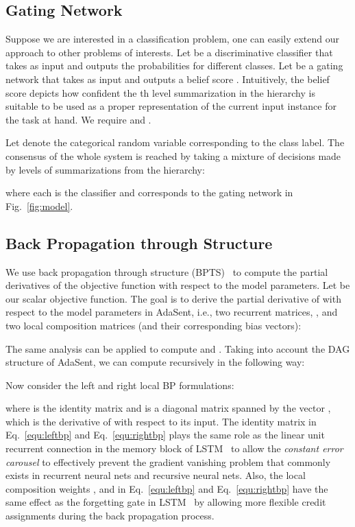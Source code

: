\documentclass{article}
\theoremstyle{definition}
\begin{document}
\subsection{Gating Network}
Suppose we are interested in a classification problem, one can easily extend our approach to other problems of interests. Let  be a discriminative classifier that takes  as input and outputs the probabilities for different classes. Let  be a gating network that takes  as input and outputs a belief score . Intuitively, the belief score  depicts how confident the th level summarization in the hierarchy is suitable to be used as a proper representation of the current input instance for the task at hand. We require  and .

Let  denote the categorical random variable corresponding to the class label. The consensus of the whole system is reached by taking a mixture of decisions made by levels of summarizations from the hierarchy:

where each  is the classifier and  corresponds to the gating network in Fig.~\ref{fig:model}.

\subsection{Back Propagation through Structure}
We use back propagation through structure (BPTS)~\cite{goller1996learning} to compute the partial derivatives of the objective function with respect to the model parameters. Let  be our scalar objective function. The goal is to derive the partial derivative of  with respect to the model parameters in AdaSent, i.e., two recurrent matrices, ,  and two local composition matrices  (and their corresponding bias vectors):

The same analysis can be applied to compute  and . Taking into account the DAG structure of AdaSent, we can compute  recursively in the following way:

Now consider the left and right local BP formulations:

where  is the identity matrix and  is a diagonal matrix spanned by the vector , which is the derivative of  with respect to its input. The identity matrix in Eq.~\ref{equ:leftbp} and Eq.~\ref{equ:rightbp} plays the same role as the linear unit recurrent connection in the memory block of LSTM~\cite{hochreiter1997long} to allow the \emph{constant error carousel} to effectively prevent the gradient vanishing problem that commonly exists in recurrent neural nets and recursive neural nets. Also, the local composition weights ,  and  in Eq.~\ref{equ:leftbp} and Eq.~\ref{equ:rightbp} have the same effect as the forgetting gate in LSTM~\cite{gers2000learning} by allowing more flexible credit assignments during the back propagation process.
\end{document}
